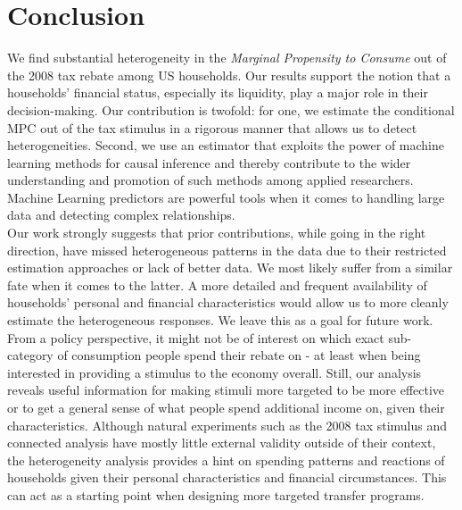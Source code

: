 \section{Conclusion} \label{sec:conc}
We find substantial heterogeneity in the \textit{Marginal Propensity to Consume} out of the 2008 tax rebate among US households. Our results support the notion that a households' financial status, especially its liquidity, play a major role in their decision-making. Our contribution is twofold: for one, we estimate the conditional MPC out of the tax stimulus in a rigorous manner that allows us to detect heterogeneities. Second, we use an estimator that exploits the power of machine learning methods for causal inference and thereby contribute to the wider understanding and promotion of such methods among applied researchers. Machine Learning predictors are powerful tools when it comes to handling large data and detecting complex relationships. \\ 
Our work strongly suggests that prior contributions, while going in the right direction, have missed heterogeneous patterns in the data due to their restricted estimation approaches or lack of better data. We most likely suffer from a similar fate when it comes to the latter. A more detailed and frequent availability of households' personal and financial characteristics would allow us to more cleanly estimate the heterogeneous responses. We leave this as a goal for future work. \\
From a policy perspective, it might not be of interest on which exact sub-category of consumption people spend their rebate on - at least when being interested in providing a stimulus to the economy overall. Still, our analysis reveals useful information for making stimuli more targeted to be more effective or to get a general sense of what people spend additional income on, given their characteristics. Although natural experiments such as the 2008 tax stimulus and connected analysis have mostly little external validity outside of their context, the heterogeneity analysis provides a hint on spending patterns and reactions of households given their personal characteristics and financial circumstances. This can act as a starting point when designing more targeted transfer programs. 